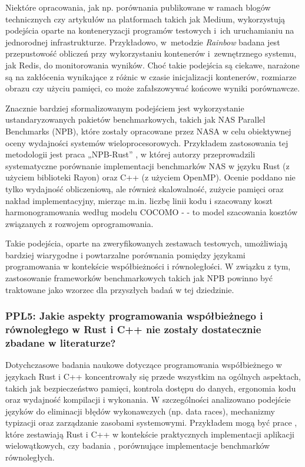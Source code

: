 Niektóre opracowania, jak np. porównania publikowane w ramach blogów technicznych czy artykułów na platformach takich jak Medium, wykorzystują podejścia oparte na konteneryzacji programów testowych i~ich uruchamianiu na jednorodnej infrastrukturze. Przykładowo, w~metodzie \textit{Rainbow} \cite{rainbow} badana jest przepustowość obliczeń przy wykorzystaniu kontenerów i~zewnętrznego systemu, jak Redis, do monitorowania wyników. Choć takie podejścia są ciekawe, narażone są na zakłócenia wynikające z różnic w czasie inicjalizacji kontenerów, rozmiarze obrazu czy użyciu pamięci, co może zafałszowywać końcowe wyniki porównawcze.

Znacznie bardziej sformalizowanym podejściem jest wykorzystanie ustandaryzowanych pakietów benchmarkowych, takich jak NAS Parallel Benchmarks (NPB), które zostały opracowane przez NASA w celu obiektywnej oceny wydajności systemów wieloprocesorowych. Przykładem zastosowania tej metodologii jest praca „NPB-Rust” \cite{martins2025npbrustnasparallelbenchmarks}, w której autorzy przeprowadzili systematyczne porównanie implementacji benchmarków NAS w języku Rust (z użyciem biblioteki Rayon) oraz C++ (z użyciem OpenMP). Ocenie poddano nie tylko wydajność obliczeniową, ale również skalowalność, zużycie pamięci oraz nakład implementacyjny, mierząc m.in. liczbę linii kodu i szacowany koszt harmonogramowania według modelu COCOMO -  - to model szacowania kosztów związanych z rozwojem oprogramowania.

Takie podejścia, oparte na zweryfikowanych zestawach testowych, umożliwiają bardziej wiarygodne i powtarzalne porównania pomiędzy językami programowania w kontekście współbieżności i równoległości. W związku z tym, zastosowanie frameworków benchmarkowych takich jak NPB powinno być traktowane jako wzorzec dla przyszłych badań w tej dziedzinie.

\subsubsection{PPL5: Jakie aspekty programowania współbieżnego i równoległego w Rust i C++ nie zostały dostatecznie zbadane w literaturze?}
Dotychczasowe badania naukowe dotyczące programowania współbieżnego w językach Rust i C++ koncentrowały się przede wszystkim na ogólnych aspektach, takich jak bezpieczeństwo pamięci, kontrola dostępu do danych, ergonomia kodu oraz wydajność kompilacji i wykonania. W szczególności analizowano podejście języków do eliminacji błędów wykonawczych (np. data races), mechanizmy typizacji oraz zarządzanie zasobami systemowymi. Przykładem mogą być prace \cite{heyman2020comparison}, które zestawiają Rust i C++ w kontekście praktycznych implementacji aplikacji wielowątkowych, czy badania \cite{martins2025npbrustnasparallelbenchmarks}, porównujące implementacje benchmarków równoległych.


